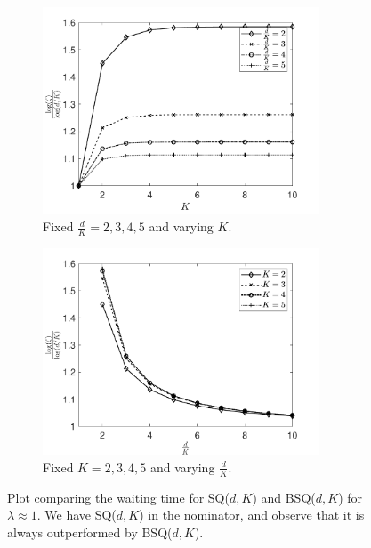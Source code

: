 \documentclass[12pt]{report}
\begin{document}
\begin{figure}[t]
\begin{subfigure}{.45\textwidth}
\centering
\includegraphics[width=0.9\textwidth]{figures/Chapter8/fig_BSQdK_vs_SQdK1.pdf}
\caption{Fixed $\frac{d}{K} = 2,3,4,5$ and varying $K$.}
\label{fig:fig_BSQdK_vs_SQdK1}
\end{subfigure}
\begin{subfigure}{.45\textwidth}
\centering
\includegraphics[width=0.9\textwidth]{figures/Chapter8/fig_BSQdK_vs_SQdK2.pdf}
\caption{Fixed $K=2,3,4,5$ and varying $\frac{d}{K}$.}
\label{fig:fig_BSQdK_vs_SQdK2}
\end{subfigure}
\caption{Plot comparing the waiting time for SQ($d,K$) and BSQ($d,K$) for $\lambda \approx 1$. We have SQ($d, K$) in the nominator, and observe that it is always outperformed by BSQ($d, K$).}\label{fig:fig_BSQdK_vs_SQdK}
\end{figure}
\end{document}
